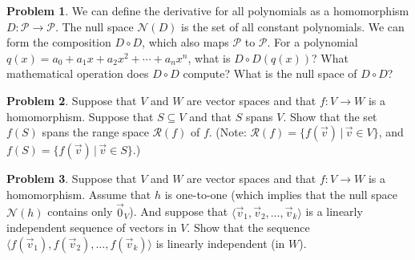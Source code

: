 \documentclass[11pt]{article}
\theoremstyle{definition}
\newtheorem{problem}{Problem}
\newenvironment{answer}{\par\bigskip\bgroup\color{darkblue}}{\egroup}
\begin{document}
\begin{problem}
We can define the derivative for all polynomials as a homomorphism $D\colon \mathscr P\to \mathscr P$.
The null space $\mathscr N(D)$ is the set of all constant polynomials.  We can form the composition
$D\circ D$, which also maps $\mathscr P$ to $\mathscr P$.  For a polynomial $q(x) 
= a_0 + a_1x+a_2x^2+\cdots+a_nx^n$, what is $D\circ D(q(x))$?  What mathematical operation does $D\circ D$
compute?  What is the null space of $D\circ D$?
\end{problem}


\begin{answer}
\end{answer}





\begin{problem}
Suppose that $V$ and $W$ are vector spaces and that $f\colon V\to W$
is a homomorphism.  Suppose that $S\subseteq V$ and that $S$ spans $V$.
Show that the set $f(S)$ spans the range space $\mathscr R(f)$ of $f$.
(Note: $\mathscr R(f)=\{f(\vec v)\,|\,\vec v\in V\}$, and $f(S)=\{f(\vec v)\,|\,\vec v\in S\}$.)
\end{problem}

\begin{answer}
\end{answer}




\begin{problem}
Suppose that $V$ and $W$ are vector spaces and that $f\colon V\to W$
is a homomorphism.  Assume that $h$ is one-to-one (which implies that
the null space $\mathscr N(h)$ contains only $\vec 0_V$).  And
suppose that $\langle \vec v_1,\vec v_2,\dots,\vec v_k \rangle$
is a linearly independent sequence of vectors in $V$. Show that
the sequence $\langle f(\vec v_1),f(\vec v_2),\dots,f(\vec v_k) \rangle$
is linearly independent (in $W$).
\end{problem}

\begin{answer}
\end{answer}
\end{document}
